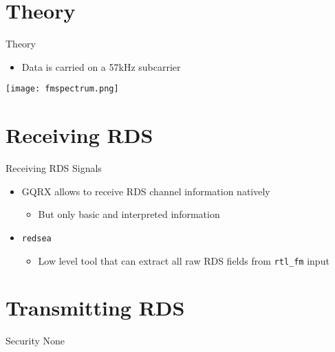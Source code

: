 \documentclass[10pt]{beamer}
\begin{document}
\section{Theory}
\begin{frame}{Theory}
\centering
\begin{itemize}
    \item Data is carried on a 57kHz subcarrier
\end{itemize}

\texttt{[image: fmspectrum.png]}

\end{frame}

\section{Receiving RDS}
\begin{frame}[fragile]{Receiving RDS Signals}
\begin{itemize}
    \item GQRX allows to receive RDS channel information natively
    \begin{itemize}
        \item But only basic and interpreted information
    \end{itemize}
    \item \verb|redsea|
    \begin{itemize}
        \item Low level tool that can extract all raw RDS fields from \verb|rtl_fm| input
    \end{itemize}
\end{itemize}
\end{frame}

\section{Transmitting RDS}

\begin{frame}{Security}
    \pause \centering None
\end{frame}
\end{document}
